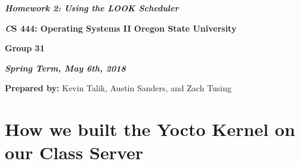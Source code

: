\documentclass[onecolumn, draftclsnofoot,10pt, compsoc]{IEEEtran}
\def \ClassName{		CS 444: Operating Systems II }
\def \TeamNumber{		Group 31}
\def \GroupMemberOne{			Kevin Talik}
\def \GroupMemberTwo{			Austin Sanders}
\def \GroupMemberThree{			Zach Tusing}
\begin{document}
 	\begin{center}
	\huge\bf{ } 
   
    \large\textbf{\textit{ Homework 2: Using the LOOK Scheduler }}\par
     
    
    
	\small{\bf\textit \ClassName Oregon State University}\par
    \small{\bf{\TeamNumber}}
    
    
    {\bf\textit{ Spring Term, May 6th, 2018} }
    
    
    {\small {\bf Prepared by:} \GroupMemberOne, \GroupMemberTwo, and \GroupMemberThree }
        \end{center}
 		\vfill

       \pagebreak
       \section{How we built the Yocto Kernel on our Class Server}
        
\end{document}
